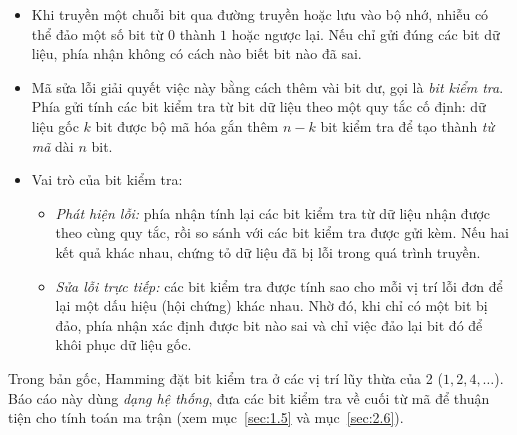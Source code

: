 \begin{itemize}
  \item Khi truyền một chuỗi bit qua đường truyền hoặc lưu vào bộ nhớ, nhiễu
        có thể đảo một số bit từ $0$ thành $1$ hoặc ngược lại. Nếu chỉ gửi
        đúng các bit dữ liệu, phía nhận không có cách nào biết bit nào đã sai.
  \item Mã sửa lỗi giải quyết việc này bằng cách thêm vài bit dư, gọi là
        \emph{bit kiểm tra}. Phía gửi tính các bit kiểm tra từ bit dữ liệu
        theo một quy tắc cố định: dữ liệu gốc $k$ bit được bộ mã hóa gắn thêm
        $n - k$ bit kiểm tra để tạo thành \emph{từ mã} dài $n$ bit.
  \item Vai trò của bit kiểm tra:
        \begin{itemize}
          \item \emph{Phát hiện lỗi:} phía nhận tính lại các bit kiểm tra từ
                dữ liệu nhận được theo cùng quy tắc, rồi so sánh với các bit
                kiểm tra được gửi kèm. Nếu hai kết quả khác nhau, chứng tỏ dữ
                liệu đã bị lỗi trong quá trình truyền.
          \item \emph{Sửa lỗi trực tiếp:} các bit kiểm tra được tính sao cho
                mỗi vị trí lỗi đơn để lại một dấu hiệu (hội chứng) khác nhau.
                Nhờ đó, khi chỉ có một bit bị đảo, phía nhận xác định được bit
                nào sai và chỉ việc đảo lại bit đó để khôi phục dữ liệu gốc.
        \end{itemize}
\end{itemize}

Trong bản gốc, Hamming đặt bit kiểm tra ở các vị trí lũy thừa của 2
($1, 2, 4, \dots$). Báo cáo này dùng \emph{dạng hệ thống}, đưa các bit kiểm
tra về cuối từ mã để thuận tiện cho tính toán ma trận (xem mục~\ref{sec:1.5}
và mục~\ref{sec:2.6}).

